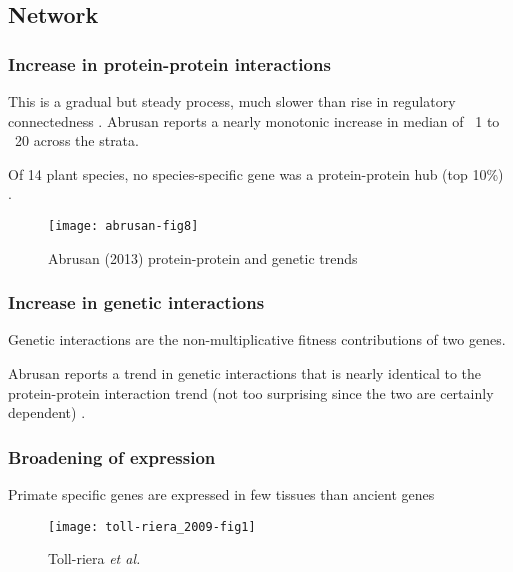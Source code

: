 \subsection{Network} \subsubsection{Increase in protein-protein
interactions}

        This is a gradual but steady process, much slower than rise in
        regulatory connectedness \cite{abrusan_integration_2013}. Abrusan
        reports a nearly monotonic increase in median of ~1 to ~20 across
        the strata.

        Of 14 plant species, no species-specific gene was a protein-protein
        hub (top 10\%) \cite{ye_evolutionary_2013}.


        \begin{figure}[h!] \centering
            \texttt{[image: abrusan-fig8]} \caption{Abrusan
            (2013) protein-protein and genetic trends} \end{figure}

    \subsubsection{Increase in genetic interactions}

        Genetic interactions are the non-multiplicative fitness
        contributions of two genes.

        Abrusan reports a trend in genetic interactions that is nearly
        identical to the protein-protein interaction trend (not too
        surprising since the two are certainly dependent)
        \cite{abrusan_integration_2013}.

    \subsubsection{Broadening of expression}

        Primate specific genes are expressed in few tissues than ancient
        genes \cite{toll-riera_origin_2009}

        \begin{figure}[h!] \centering
            \texttt{[image: toll-riera\_2009-fig1]}
            \caption{Toll-riera \textit{et al.}} \end{figure} \FloatBarrier
